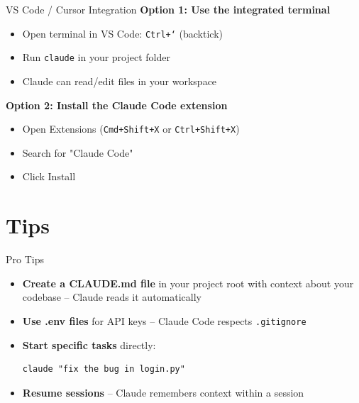 \documentclass{beamer}
\begin{document}
\begin{frame}{VS Code / Cursor Integration}
    \textbf{Option 1: Use the integrated terminal}
    \begin{itemize}
        \item Open terminal in VS Code: \texttt{Ctrl+`} (backtick)
        \item Run \texttt{claude} in your project folder
        \item Claude can read/edit files in your workspace
    \end{itemize}

    \vspace{0.5cm}
    \textbf{Option 2: Install the Claude Code extension}
    \begin{itemize}
        \item Open Extensions (\texttt{Cmd+Shift+X} or \texttt{Ctrl+Shift+X})
        \item Search for "Claude Code"
        \item Click Install
    \end{itemize}
\end{frame}

\section{Tips}

\begin{frame}[fragile]{Pro Tips}
    \begin{itemize}
        \item \textbf{Create a CLAUDE.md file} in your project root with context about your codebase -- Claude reads it automatically

        \vspace{0.3cm}
        \item \textbf{Use .env files} for API keys -- Claude Code respects \texttt{.gitignore}

        \vspace{0.3cm}
        \item \textbf{Start specific tasks} directly:
\begin{lstlisting}
claude "fix the bug in login.py"
\end{lstlisting}

        \vspace{0.3cm}
        \item \textbf{Resume sessions} -- Claude remembers context within a session
    \end{itemize}
\end{frame}
\end{document}
